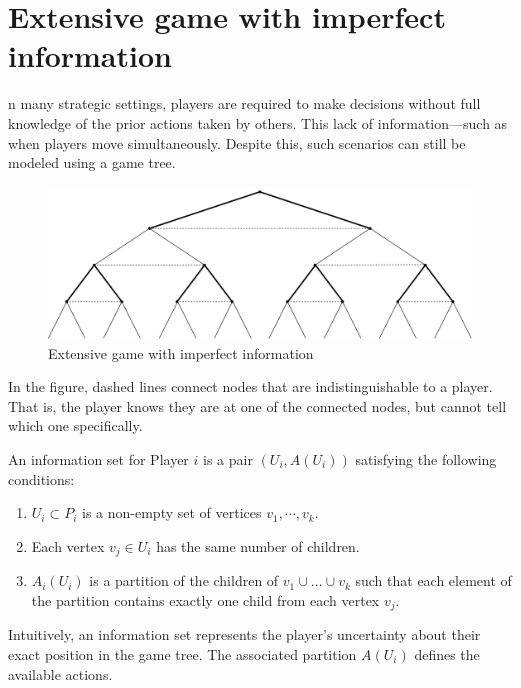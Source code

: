 \section{Extensive game with imperfect information}

n many strategic settings, players are required to make decisions without full knowledge of the prior actions taken by others. 
This lack of information—such as when players move simultaneously. 
Despite this, such scenarios can still be modeled using a game tree.
\begin{figure}[H]
    \centering
    \includegraphics[width=0.75\linewidth]{images/gt.png}
    \caption{Extensive game with imperfect information}
\end{figure}
In the figure, dashed lines connect nodes that are indistinguishable to a player. 
That is, the player knows they are at one of the connected nodes, but cannot tell which one specifically.
\begin{definition}
    An information set for Player $i$ is a pair $(U_i, A(U_i))$ satisfying the following conditions: 
    \begin{enumerate}
        \item $U_i \subset P_i$ is a non-empty set of vertices $v_1, \cdots, v_k$.
        \item Each vertex $v_j\in U_i$ has the same number of children.
        \item $A_i(U_i)$ is a partition of the children of $v_1 \cup \dots \cup v_k$ such that each element of the partition contains exactly one child from each vertex $v_j$.
    \end{enumerate}
\end{definition}
\noindent Intuitively, an information set represents the player's uncertainty about their exact position in the game tree. 
The associated partition $A(U_i)$ defines the available actions.

